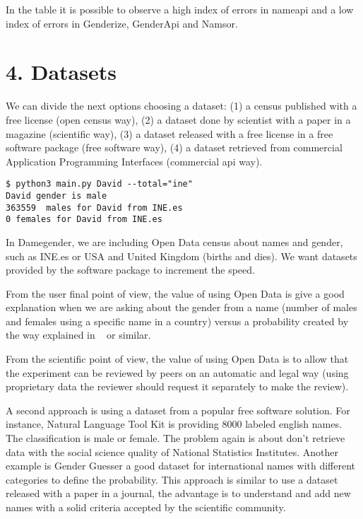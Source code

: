 \documentclass[fleqn,10pt,lineno]{wlpeerj} %
\begin{document}
In the table it is possible to observe a high index of errors in
nameapi and a low index of errors in Genderize, GenderApi and Namsor.

\section*{4. Datasets}

We can divide the next options choosing a dataset: (1) a census
published with a free license (open census way), (2) a dataset done by
scientist with a paper in a magazine (scientific way), (3) a dataset
released with a free license in a free software package (free software
way), (4) a dataset retrieved from commercial Application Programming
Interfaces (commercial api way).

\begin{verbatim}
$ python3 main.py David --total="ine"
David gender is male
363559  males for David from INE.es
0 females for David from INE.es
\end{verbatim}

In Damegender, we are including Open Data census about names and
gender, such as INE.es or USA and United Kingdom (births and dies). We
want datasets provided by the software package to increment the speed.

From the user final point of view, the value of using Open Data is
give a good explanation when we are asking about the gender from a
name (number of males and females using a specific name in a country)
versus a probability created by the way explained in
~\cite{10.7717/peerj-cs.156} or similar.

From the scientific point of view, the value of using Open Data is to
allow that the experiment can be reviewed by peers on an automatic and
legal way (using proprietary data the reviewer should request it
separately to make the review).

A second approach is using a dataset from a popular free software
solution. For instance, Natural Language Tool Kit is providing 8000
labeled english names. The classification is male or female. The
problem again is about don't retrieve data with the social science
quality of National Statistics Institutes. Another example is Gender
Guesser a good dataset for international names with different
categories to define the probability. This approach is similar to use
a dataset released with a paper in a journal, the advantage is to
understand and add new names with a solid criteria accepted by the
scientific community.
\end{document}
